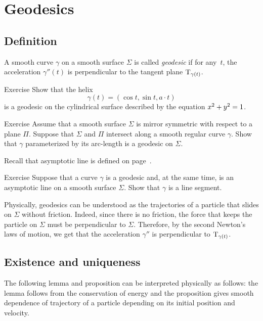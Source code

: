 \chapter{Geodesics}


\section{Definition}

A smooth curve $\gamma$ on a smooth surface $\Sigma$ is called \emph{geodesic} if for any~$t$, the acceleration $\gamma''(t)$ is perpendicular to the tangent plane $\mathrm{T}_{\gamma(t)}$.

\begin{thm}{Exercise}\label{ex:helix=geodesic}
Show that the helix 
\[\gamma(t)=(\cos t,\sin t, a\cdot t)\]
is a geodesic on the cylindrical surface described by the equation $x^2\z+y^2=1$.
\end{thm}

\begin{thm}{Exercise}\label{ex:reflection-geodesic}
Assume that a smooth surface $\Sigma$ is mirror symmetric with respect to  a plane $\Pi$.
Suppose that $\Sigma$ and $\Pi$ intersect along a smooth regular curve $\gamma$.
Show that $\gamma$ parameterized by its arc-length is a geodesic on $\Sigma$.
\end{thm}

Recall that asymptotic line is defined on page~\pageref{page:asymptotic line}.

\begin{thm}{Exercise}\label{ex:asymptotic-geodesic}
Suppose that a curve $\gamma$ is a geodesic and, at the same time, is an asymptotic line on a smooth surface $\Sigma$.
Show that $\gamma$ is a line segment.
\end{thm}

Physically, geodesics can be understood as the trajectories of a particle that slides on $\Sigma$ without friction.
Indeed, since there is no friction, the force that keeps the particle on $\Sigma$ must be perpendicular to $\Sigma$.
Therefore, by the second Newton's laws of motion,
we get that the acceleration $\gamma''$ is perpendicular to $\mathrm{T}_{\gamma(t)}$.

\section{Existence and uniqueness}

The following lemma and proposition can be interpreted physically as follows:
the lemma follows from the conservation of energy and the proposition gives smooth dependence of trajectory of a particle depending on its initial position and velocity.

